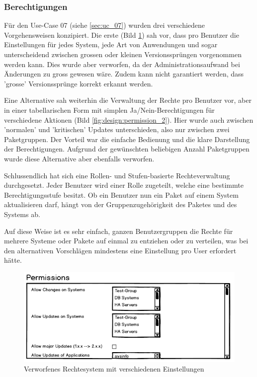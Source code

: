 \subsubsection*{Berechtigungen} \label{sec:design:permissions}

Für den Use-Case 07 (siehe \ref{sec:uc_07}) wurden drei verschiedene Vorgehensweisen konzipiert. Die erste (Bild \ref{fig:design:permission_1}) sah vor, dass pro Benutzer die Einstellungen für jedes System, jede Art von Anwendungen und sogar unterscheidend zwischen grossen oder kleinen Versionssprüngen vorgenommen werden kann. Dies wurde aber verworfen, da der Administrationsaufwand bei Änderungen zu gross gewesen wäre. Zudem kann nicht garantiert werden, dass 'grosse' Versionssprünge korrekt erkannt werden.

Eine Alternative sah weiterhin die Verwaltung der Rechte pro Benutzer vor, aber in einer tabellarischen Form mit simplen Ja/Nein-Berechtigungen für verschiedene Aktionen (Bild \ref{fig:design:permission_2}). Hier wurde auch zwischen 'normalen' und 'kritischen' Updates unterschieden, also nur zwischen zwei Paketgruppen. Der Vorteil war die einfache Bedienung und die klare Darstellung der Berechtigungen. Aufgrund der gewünschten beliebigen Anzahl Paketgruppen wurde diese Alternative aber ebenfalls verworfen.

Schlussendlich hat sich eine Rollen- und Stufen-basierte Rechteverwaltung durchgesetzt. Jeder Benutzer wird einer Rolle zugeteilt, welche eine bestimmte Berechtigungsstufe besitzt. Ob ein Benutzer nun ein Paket auf einem System aktualisieren darf, hängt von der Gruppenzugehörigkeit des Paketes und des Systems ab.

Auf diese Weise ist es sehr einfach, ganzen Benutzergruppen die Rechte für mehrere Systeme oder Pakete auf einmal zu entziehen oder zu verteilen, was bei den alternativen Vorschlägen mindestens eine Einstellung pro User erfordert hätte.

\begin{figure}[H]
	\centering
	\includegraphics[width=0.75\linewidth]{files/mockups/permission_1}
	\caption{Verworfenes Rechtesystem mit verschiedenen Einstellungen}
	\label{fig:design:permission_1}
\end{figure}

